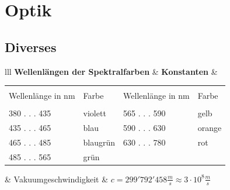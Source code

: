 \section{Optik}
\subsection{Diverses}
	\begin{tabular}{lll}
		\textbf{Wellenlängen der Spektralfarben} & \textbf{Konstanten} &\\
			\begin{minipage}{8cm}
            	\tiny
					\begin{tabular}{|l|l|l|l|}
	            		\hline & & & \\
		            		Wellenlänge in nm & Farbe & Wellenlänge in nm & Farbe \\
	            		\hline & & & \\
		            		380 . . . 435 & violett  & 565 . . . 590 & gelb \\
		            		435 . . . 465 & blau     & 590 . . . 630 & orange \\
							465 . . . 485 & blaugrün & 630 . . . 780 & rot \\
							485 . . . 565 & grün & & \\
						\hline
	            	\end{tabular}
            \end{minipage} & Vakuumgeschwindigkeit & $c=299'792'458 \frac{m}{s} \approx
            3 \cdot 10^8 \frac{m}{s}$\\
	\end{tabular}

